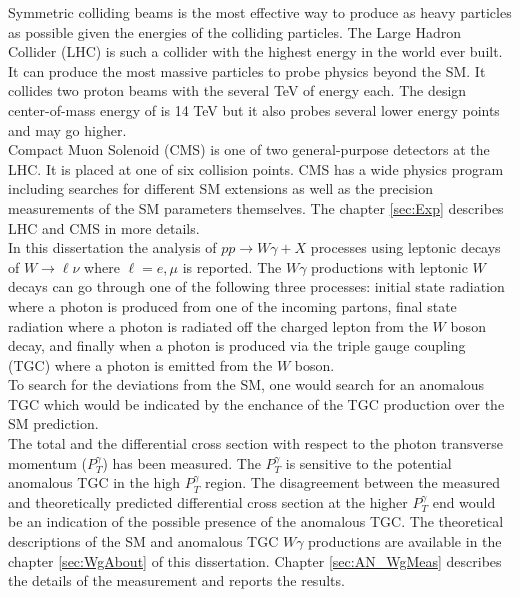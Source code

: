 Symmetric colliding beams is the most effective way to produce as heavy particles as possible given the energies of the colliding particles. The Large Hadron Collider (LHC) is such a collider with the highest energy in the world ever built. It can produce the most massive particles to probe physics beyond the SM. It collides two proton beams with the several TeV of energy each. The design center-of-mass energy of is 14 TeV but it also probes several lower energy points and may go higher. \\

Compact Muon Solenoid (CMS) is one of two general-purpose detectors at the LHC. It is placed at one of six collision points. CMS has a wide physics program including searches for different SM extensions as well as the precision measurements of the SM parameters themselves. The chapter \ref{sec:Exp} describes LHC and CMS in more details.\\

In this dissertation the analysis of $pp\rightarrow W\gamma + X$  processes using  leptonic decays of $W\to \ell\nu$ where $\ell = e, \mu$ is reported. The $W\gamma$ productions with leptonic $W$ decays can go through one of the following three processes: initial state radiation where a photon is produced from one of the incoming partons, final state radiation where a photon is radiated off the charged lepton from the $W$ boson decay, and finally when a photon is produced via the triple gauge coupling (TGC) where a photon is emitted from the $W$ boson. \\ 

To search for the deviations from the SM, one would search for an anomalous TGC which would be indicated by the enchance of the TGC production over the SM prediction. \\

The total and the differential cross section with respect to the photon transverse momentum ($P_T^\gamma$) has been measured. The $P_T^{\gamma}$ is sensitive to the potential anomalous TGC in the high $P_T^{\gamma}$ region. The disagreement between the measured and theoretically predicted differential cross section at the higher $P_T^{\gamma}$ end would be an indication of the possible presence of the anomalous TGC. The theoretical descriptions of the SM and anomalous TGC $W\gamma$ productions are available in the chapter \ref{sec:WgAbout} of this dissertation. Chapter \ref{sec:AN_WgMeas} describes the details of the measurement and reports the results.\\ 



%
%
%
%
%
%
